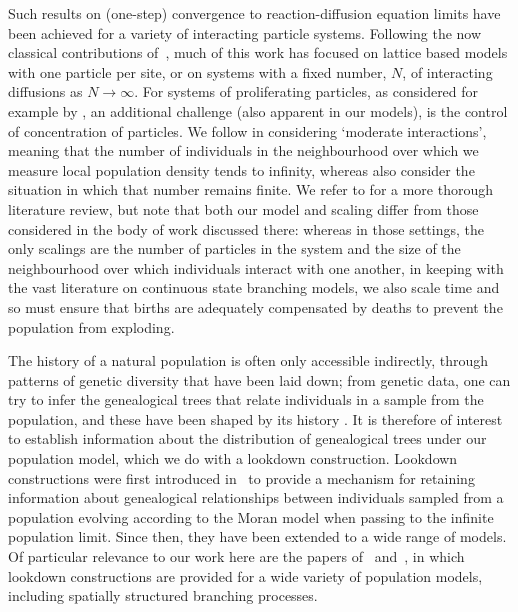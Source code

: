 \documentclass[12pt]{article}
\numberwithin{equation}{section}
\begin{document}
Such results on (one-step) convergence to reaction-diffusion 
equation limits have been
achieved for a variety of interacting particle systems. 
Following the now classical contributions 
of~\citet{demasi/ferrari/lebowitz:1986, demasi/presutti:1991, oelschlaeger:1985},
much of this work has focused on lattice based models with one particle
per site, or on systems with a fixed number, $N$,
of interacting diffusions as $N\to\infty$.
For systems of proliferating particles,
as considered for example by 
\citet{oelschlaeger:1989, flandoli/leimbach/olivera:2019, flandoli/huang:2021}, 
an additional challenge (also apparent in our models), is 
the control of concentration of particles. 
We follow 
\citet{oelschlaeger:1989, flandoli/leimbach/olivera:2019} in considering
`moderate interactions', meaning that
the number of individuals in the neighbourhood over which we measure local
population density tends to infinity, whereas 
\citet{flandoli/huang:2021} also consider the situation in which
that number remains finite. 
We refer to \citet{flandoli/huang:2021} for a more thorough 
literature review, 
but note that both our model and scaling differ from those considered
in the body of work discussed there: whereas in those settings, the only 
scalings are the number of particles in the system and the size of the
neighbourhood over which individuals interact with one another, in
keeping with the vast literature on continuous state branching models, we 
also scale time and so must ensure that births are 
adequately compensated by deaths to prevent the population from exploding. 

The history of a natural population is often only accessible indirectly, 
through patterns of genetic diversity that have been laid down; from 
genetic data, one can try to infer the genealogical trees that relate 
individuals in a sample from the population, and these have been shaped 
by its history \citep[see e.g.,][]{neigel1993application,kelleher2019inferring}.
It is therefore of interest to establish information about the distribution of genealogical trees 
under our population model, which we do with a lookdown construction. 
Lookdown constructions were first introduced in~\cite{donnelly/kurtz:1996} to provide 
a mechanism for retaining information about genealogical relationships between individuals
sampled from a population evolving according to the Moran model when passing to the 
infinite population limit.
Since then, they have been extended to a wide range of models. Of particular
relevance to our work here are the papers of~\cite{kurtz/rodrigues:2011} 
and~\cite{etheridge/kurtz:2019}, in which
lookdown constructions are provided for a wide variety of population models, including
spatially structured branching processes.
\end{document}
